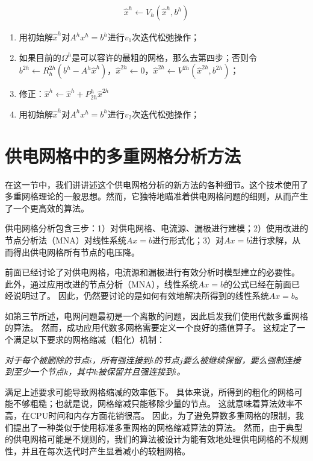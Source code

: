 \begin{align*}
\hat{x}^h \leftarrow V_h(\hat{x}^h, b^h)
\end{align*}
\begin{enumerate}
\item 用初始解$\hat{x}^h$对$A^hx^h=b^h$进行$v_1$次迭代松弛操作；
\item 如果目前的$\Omega^h$是可以容许的最粗的网格，那么去第四步；否则令$b^{2h}\leftarrow R_{h}^{2h}(b^h-A^h\hat{x}^h)$，$\hat{x}^{2h}\leftarrow 0$，$\hat{x}^{2h}\leftarrow V^{2h}(\hat{x}^{2h}, b^{2h})$；
\item 修正：$\hat{x}^{h} \leftarrow \hat{x}^h + P^h_{2h}\hat{x}^{2h}$
\item 用初始解$\hat{x}^h$对$A^hx^h=b^h$进行$v_2$次迭代松弛操作；
\end{enumerate}


\section{供电网格中的多重网格分析方法}

在这一节中，我们讲讲述这个供电网格分析的新方法的各种细节。这个技术使用了多重网格理论的一般思想。然而，它独特地瞄准着供电网格问题的细则，从而产生了一个更高效的算法。

供电网格分析包含三步：1）对供电网格、电流源、漏极进行建模；2）使用改进的节点分析法（MNA）对线性系统$Ax=b$进行形式化；3）对$Ax=b$进行求解，从而得出供电网格所有节点的电压降。

前面已经讨论了对供电网格，电流源和漏极进行有效分析时模型建立的必要性。 此外，通过应用改进的节点分析（MNA），线性系统$Ax = b$的公式已经在前面已经说明过了。 因此，仍然要讨论的是如何有效地解决所得到的线性系统$Ax = b$。

如第三节所述，电网问题最初是一个离散的问题，因此启发我们使用代数多重网格的算法。 然而，成功应用代数多网格需要定义一个良好的插值算子。 这规定了一个满足以下要求的网格缩减（粗化）机制：

\emph{对于每个被删除的节点$i$，所有强连接到$i$的节点$j$要么被继续保留，要么强制连接到至少一个节点$k$，其中$k$被保留并且强连接到$i$。}

满足上述要求可能导致网格缩减的效率低下。 具体来说，所得到的粗化的网格可能不够粗糙；也就是说，网格缩减只能移除少量的节点。 这就意味着算法效率不高，在CPU时间和内存方面花销很高。 因此，为了避免算数多重网格的限制，我们提出了一种类似于使用标准多重网格的网格缩减算法的算法。 然而，由于典型的供电网格可能是不规则的，我们的算法被设计为能有效地处理供电网格的不规则性，并且在每次迭代时产生显着减小的较粗网格。

